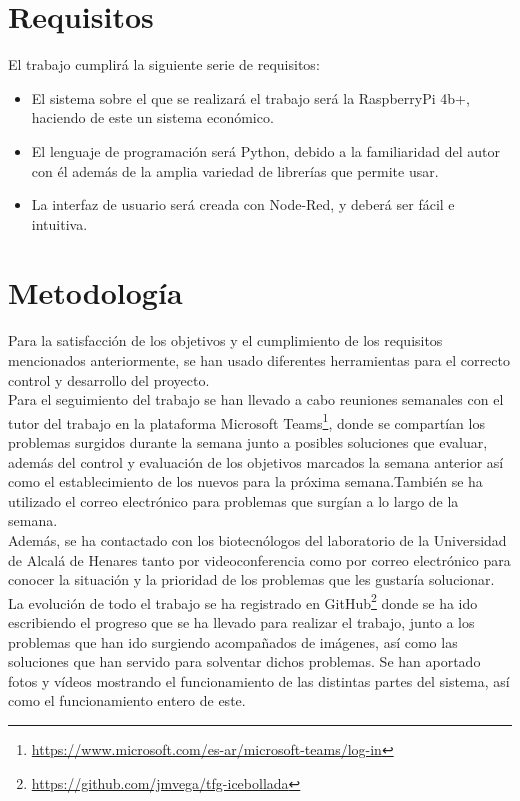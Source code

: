 \section{Requisitos}
\label{sec:requisitos}
El trabajo cumplirá la siguiente serie de requisitos:
\begin{itemize}
 \item El sistema sobre el que se realizará el trabajo será la RaspberryPi 4b+, haciendo de este un sistema económico. 
 \item El lenguaje de programación será Python, debido a la familiaridad del autor con él además de la amplia variedad de librerías que permite usar.
 \item La interfaz de usuario será creada con Node-Red, y deberá ser fácil e intuitiva.
\end{itemize}
\section{Metodología}
\label{sec:metodologia}
Para la satisfacción de los objetivos y el cumplimiento de los requisitos mencionados anteriormente, se han usado diferentes herramientas para el correcto control y desarrollo del proyecto.\\

Para el seguimiento del trabajo se han llevado a cabo reuniones semanales con el tutor del trabajo en la plataforma Microsoft Teams\footnote{\url{https://www.microsoft.com/es-ar/microsoft-teams/log-in}}, donde se compartían los problemas surgidos durante la semana junto a posibles soluciones que evaluar, además del control y evaluación de los objetivos marcados la semana anterior así como el establecimiento de los nuevos para la próxima semana.También se ha utilizado el correo electrónico para problemas que surgían a lo largo de la semana.\\
Además, se ha contactado con los biotecnólogos del laboratorio de la Universidad de Alcalá de Henares tanto por videoconferencia como por correo electrónico para conocer la situación y la prioridad de los problemas que les gustaría solucionar.\\

La evolución de todo el trabajo se ha registrado en GitHub\footnote{\url{https://github.com/jmvega/tfg-icebollada}} donde se ha ido escribiendo el progreso que se ha llevado para realizar el trabajo, junto a los problemas que han ido surgiendo acompañados de imágenes, así como las soluciones que han servido para solventar dichos problemas. Se han aportado fotos y vídeos mostrando el funcionamiento de las distintas partes del sistema, así como el funcionamiento entero de este.

